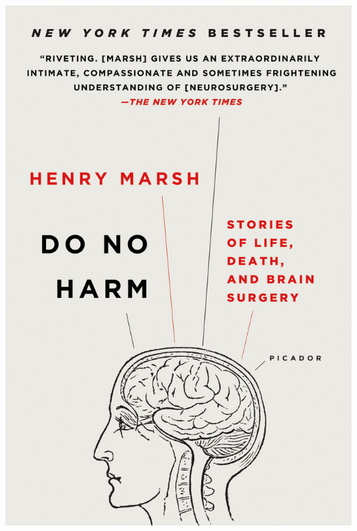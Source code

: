 \documentclass{tufte-handout}
\makeatletter
\newcommand{\varcaption}[2][0pt]{%
  \gsetlength{\@tufte@caption@vertical@offset}{-#1}%
  \gdef\@tufte@stored@varcaption{#2}%
}
\gdef\@tufte@stored@varcaption{} %
\makeatother
\begin{document}
\begin{marginfigure}[-30\baselineskip]
   \includegraphics[width=\linewidth]{images/do_no_harm.jpg}
   \varcaption{\href{https://us.macmillan.com/books/9781250090133}{Publisher Link}, \href{https://www.amazon.com/Do-No-Harm-Stories-Surgery/dp/125009013X/}{Amazon Link}}
\end{marginfigure}
\end{document}
